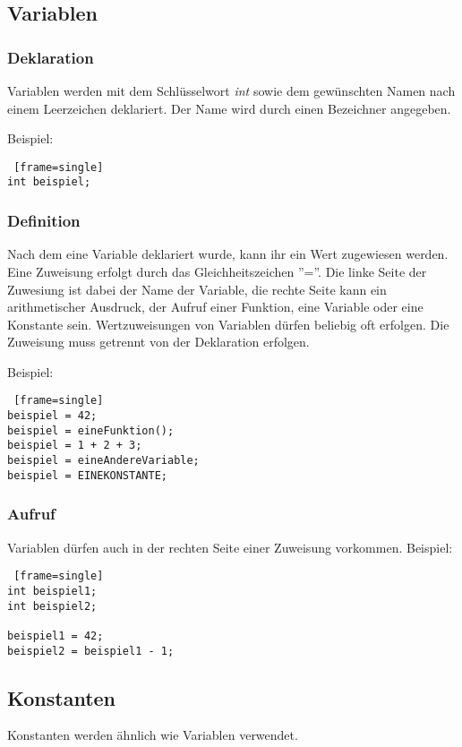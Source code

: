 \subsection{Variablen}
\subsubsection{Deklaration}
Variablen werden mit dem Schlüsselwort \textit{int} sowie dem gewünschten Namen nach einem Leerzeichen deklariert.
Der Name wird durch einen Bezeichner angegeben.

Beispiel:
\begin{lstlisting} [frame=single] 
int beispiel;
\end{lstlisting}

\subsubsection{Definition}
Nach dem eine Variable deklariert wurde, kann ihr ein Wert zugewiesen werden. Eine Zuweisung erfolgt durch das Gleichheitszeichen ''=''. Die linke Seite der Zuwesiung ist dabei der Name der Variable, die rechte Seite  kann ein arithmetischer Ausdruck, der Aufruf einer Funktion, eine Variable oder eine Konstante sein.
Wertzuweisungen von Variablen dürfen beliebig oft erfolgen.
Die Zuweisung muss getrennt von der Deklaration erfolgen.

Beispiel:
\begin{lstlisting} [frame=single] 
beispiel = 42;
beispiel = eineFunktion();
beispiel = 1 + 2 + 3;
beispiel = eineAndereVariable;
beispiel = EINEKONSTANTE;
\end{lstlisting}


\subsubsection{Aufruf}
Variablen dürfen auch in der rechten Seite einer Zuweisung vorkommen.
Beispiel:
\begin{lstlisting} [frame=single] 
int beispiel1;
int beispiel2;

beispiel1 = 42;
beispiel2 = beispiel1 - 1;
\end{lstlisting}


\subsection{Konstanten}
Konstanten werden ähnlich wie Variablen verwendet.

